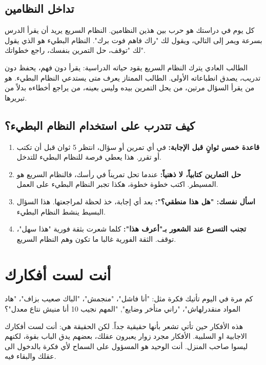 \documentclass[12pt,a4paper]{book}
\begin{document}
	\subsection{تداخل النظامين}
	
	كل يوم في دراستك هو حرب بين هذين النظامين. النظام السريع يريد أن يقرأ الدرس بسرعة ويمر إلى التالي، ويقول لك "راك فاهم فوت برك". النظام البطيء هو الذي يقول لك "توقف، حل التمرين بنفسك، راجع خطواتك".
	
	الطالب العادي يترك النظام السريع يقود حياته الدراسية: يقرأ دون فهم، يحفظ دون تدريب، يصدق انطباعاته الأولى. الطالب الممتاز يعرف متى يستدعي النظام البطيء. هو من يقرأ السؤال مرتين، من يحل التمرين بيده وليس بعينه، من يراجع أخطاءه بدلاً من تبريرها.
	
	\subsection{كيف تتدرب على استخدام النظام البطيء؟}
	
	\begin{enumerate}
		\item \textbf{قاعدة خمس ثوانٍ قبل الإجابة:} في أي تمرين أو سؤال، انتظر 5 ثوان قبل أن تكتب أو تقرر. هذا يعطي فرصة للنظام البطيء للتدخل.
		
		\item \textbf{حل التمارين كتابياً، لا ذهنياً:} عندما تحل تمريناً في رأسك، فالنظام السريع هو المسيطر. اكتب خطوة خطوة، هكذا تجبر النظام البطيء على العمل.
		
		\item \textbf{اسأل نفسك: "هل هذا منطقي؟":} بعد أي إجابة، خذ لحظة لمراجعتها. هذا السؤال البسيط ينشط النظام البطيء.
		
		\item \textbf{تجنب التسرع عند الشعور بـ"أعرف هذا":} كلما شعرت بثقة فورية "هذا سهل"، توقف. الثقة الفورية غالبا ما تكون وهم النظام السريع.
	\end{enumerate}
	
	\section{أنت لست أفكارك}
	\label{sec:you-are-not-fail}
	
	كم مرة في اليوم تأتيك فكرة مثل: "أنا فاشل"، "منجمش"، "الباك صعيب بزاف"، "هاد المواد منقدرلهاش"، "راني متأخر وضايع", "المهم نجيب 10 أنا منيش نتاع معدل"؟
	
	هذه الأفكار حين تأتي تشعر بأنها حقيقية جداً. لكن الحقيقة هي: أنت لست أفكارك الاجابية او السلبية. الأفكار مجرد زوار يعبرون عقلك، بعضهم يدق الباب بقوة، لكنهم ليسوا صاحب المنزل. أنت الوحيد هو المسؤول على السماح لأي فكرة بالدخول الى عقلك والبقاء فيه. 
	
\end{document}
